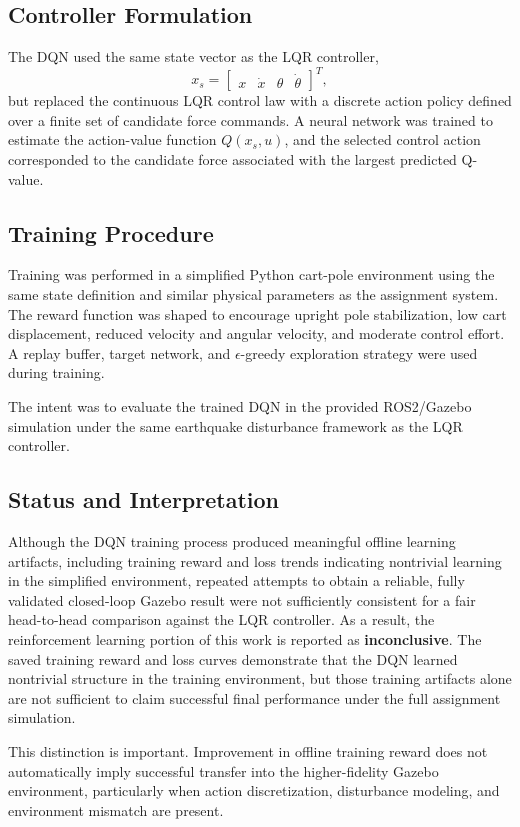 \documentclass[11pt]{article}
\begin{document}
\subsection{Controller Formulation}
The DQN used the same state vector as the LQR controller,
\[
x_s =
\begin{bmatrix}
x & \dot{x} & \theta & \dot{\theta}
\end{bmatrix}^T,
\]
but replaced the continuous LQR control law with a discrete action policy defined over a finite set of candidate force commands. A neural network was trained to estimate the action-value function \(Q(x_s,u)\), and the selected control action corresponded to the candidate force associated with the largest predicted Q-value.

\subsection{Training Procedure}
Training was performed in a simplified Python cart-pole environment using the same state definition and similar physical parameters as the assignment system. The reward function was shaped to encourage upright pole stabilization, low cart displacement, reduced velocity and angular velocity, and moderate control effort. A replay buffer, target network, and \(\epsilon\)-greedy exploration strategy were used during training.

The intent was to evaluate the trained DQN in the provided ROS2/Gazebo simulation under the same earthquake disturbance framework as the LQR controller.

\subsection{Status and Interpretation}
Although the DQN training process produced meaningful offline learning artifacts, including training reward and loss trends indicating nontrivial learning in the simplified environment, repeated attempts to obtain a reliable, fully validated closed-loop Gazebo result were not sufficiently consistent for a fair head-to-head comparison against the LQR controller. As a result, the reinforcement learning portion of this work is reported as \textbf{inconclusive}. The saved training reward and loss curves demonstrate that the DQN learned nontrivial structure in the training environment, but those training artifacts alone are not sufficient to claim successful final performance under the full assignment simulation.

This distinction is important. Improvement in offline training reward does not automatically imply successful transfer into the higher-fidelity Gazebo environment, particularly when action discretization, disturbance modeling, and environment mismatch are present.
\end{document}

